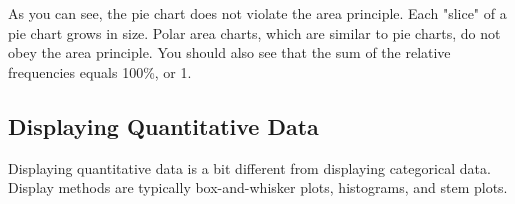 

As you can see, the pie chart does not violate the area principle. Each "slice"
of a pie chart grows in size. Polar area charts, which are similar to pie charts,
do not obey the area principle. You should also see that the sum of the relative frequencies
equals 100\%, or 1.

\subsection{Displaying Quantitative Data}
Displaying quantitative data is a bit different from displaying categorical data.
Display methods are typically box-and-whisker plots, histograms, and stem plots.

